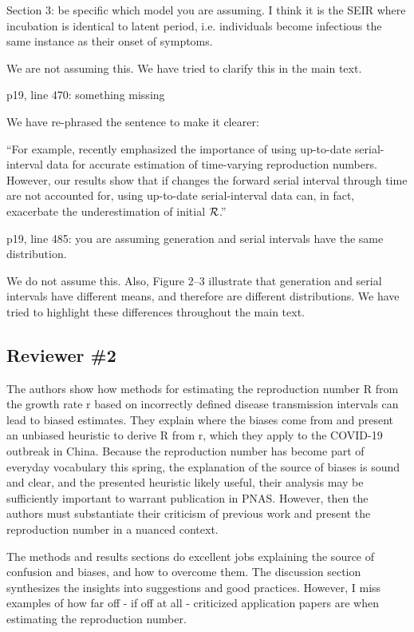 \documentclass[12pt]{article}
\newcommand{\RR}{\ensuremath{{\cal R}}}
\newcommand{\rev}{\subsection*}
\newcommand{\revtext}{\textsf}
\begin{document}
\revtext{Section 3: be specific which model you are assuming. I think it is the SEIR where incubation is identical to latent period, i.e. individuals become infectious the same instance as their onset of symptoms.}

We are not assuming this. We have tried to clarify this in the main text.

\revtext{p19, line 470: something missing}

We have re-phrased the sentence to make it clearer:

``For example, \cite{thompson2019improved} recently emphasized the importance of using up-to-date serial-interval data for accurate estimation of time-varying reproduction numbers.
However, our results show that if changes the forward serial interval through time are not accounted for, using up-to-date serial-interval data can, in fact, exacerbate the underestimation of initial \RR.''

\revtext{p19, line 485: you are assuming generation and serial intervals have the same distribution.}

We do not assume this. Also, Figure 2--3 illustrate that generation and serial intervals have different means, and therefore are different distributions. We have tried to highlight these differences throughout the main text.

\rev{Reviewer \#2}

\revtext{The authors show how methods for estimating the reproduction number R from the growth rate r based on incorrectly defined disease transmission intervals can lead to biased estimates. They explain where the biases come from and present an unbiased heuristic to derive R from r, which they apply to the COVID-19 outbreak in China. Because the reproduction number has become part of everyday vocabulary this spring, the explanation of the source of biases is sound and clear, and the presented heuristic likely useful, their analysis may be sufficiently important to warrant publication in PNAS. However, then the authors must substantiate their criticism of previous work and present the reproduction number in a nuanced context.}

\revtext{The methods and results sections do excellent jobs explaining the source of confusion and biases, and how to overcome them. The discussion section synthesizes the insights into suggestions and good practices. However, I miss examples of how far off - if off at all - criticized application papers are when estimating the reproduction number.}
\end{document}
